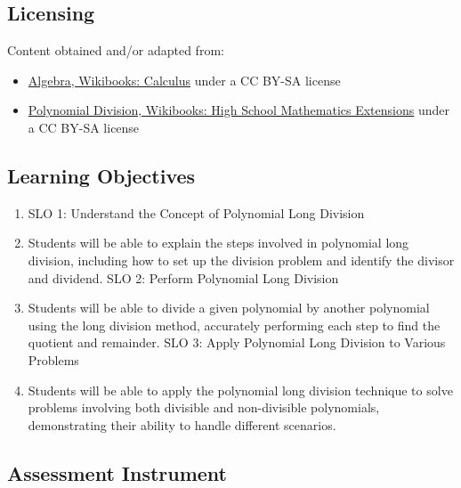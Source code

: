 \subsection{Licensing}
\label{sss:lice-7352}

Content obtained and/or adapted from:

\begin{itemize}
    \item \href{https://en.wikibooks.org/wiki/Calculus/Algebra}{Algebra, Wikibooks: Calculus} under a CC BY-SA license
    \item \href{https://en.wikibooks.org/wiki/High_School_Mathematics_Extensions/Supplementary/Polynomial_Division}{Polynomial Division, Wikibooks: High School Mathematics Extensions} under a CC BY-SA license
\end{itemize}

\subsection{Learning Objectives}
\label{ssec:lear-ae78}

\begin{enumerate}
    \item SLO 1: Understand the Concept of Polynomial Long Division
    \item Students will be able to explain the steps involved in polynomial long division, including how to set up the division problem and identify the divisor and dividend. SLO 2: Perform Polynomial Long Division
    \item Students will be able to divide a given polynomial by another polynomial using the long division method, accurately performing each step to find the quotient and remainder. SLO 3: Apply Polynomial Long Division to Various Problems
    \item Students will be able to apply the polynomial long division technique to solve problems involving both divisible and non-divisible polynomials, demonstrating their ability to handle different scenarios.
\end{enumerate}

\subsection{Assessment Instrument}
\label{ssec:asse-45f7}

